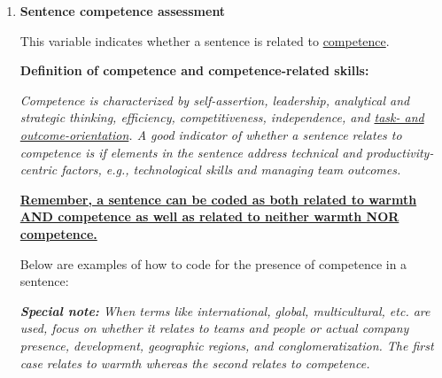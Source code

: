 \documentclass[Royal,sageapa,times]{sagej}
\begin{document}
\begin{enumerate}[label=\textbf{C\arabic*.}, wide=0pt, itemindent=0.25\textwidth]
\begin{enumerate}[label=\textbf{C\arabic{enumi}.\arabic*.}, wide=0pt]
        \noindent\textbf{\small Example: Warmth}

        \noindent\textit{\small “The candidate will develop and manage customers as well as ensure a planned approach to Customer Relationship Management in terms of identifying and strengthening revenue, relationship building and ensuring customer retention and customer visits”.}

        \begin{adjustwidth}{0.75cm}{}
            {\small Although the above example sentence mentions a specific managerial approach, its focus is on skills that are related to customer interactions, e.g., relationship building. This sentence can thus be coded as relating to warmth traits. The coding should reflect that warmth relating traits are present. Note that sentences can also be coded to reflect the presence of competence related traits if applicable.}
            \end{adjustwidth}

        \noindent\textbf{\large \uline{The sentence is:}}


        \\

        \item \noindent\textbf{Sentence competence assessment}

        This variable indicates whether a sentence is related to \uline{competence}.

        \noindent\textbf{Definition of competence and competence-related skills:}

        \textit{Competence is characterized by self-assertion, leadership, analytical and strategic thinking, efficiency, competitiveness, independence, and \uline{task- and outcome-orientation}. A good indicator of whether a sentence relates to competence is if elements in the sentence address technical and productivity-centric factors, e.g., technological skills and managing team outcomes.}

        \noindent\textbf{\uline{Remember, a sentence can be coded as both related to warmth AND competence as well as related to neither warmth NOR competence.}}

        \noindent Below are examples of how to code for the presence of competence in a sentence:

        \noindent\textit{\textbf{Special note:} When terms like international, global, multicultural, etc. are used, focus on whether it relates to teams and people or actual company presence, development, geographic regions, and conglomeratization. The first case relates to warmth whereas the second relates to competence.}


\end{enumerate}
\end{enumerate}
\end{document}
